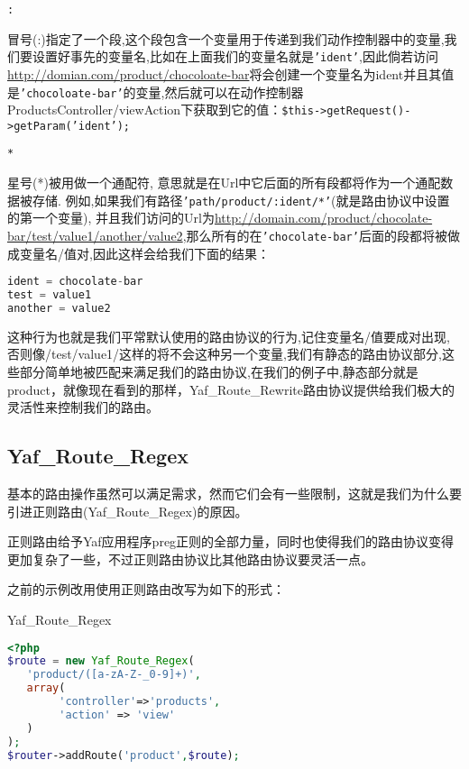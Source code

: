 \begin{compactitem}
\item \texttt{:}

冒号(:)指定了一个段,这个段包含一个变量用于传递到我们动作控制器中的变量,我们要设置好事先的变量名,比如在上面我们的变量名就是\texttt{'ident'},因此倘若访问\url{http://domian.com/product/chocoloate-bar}将会创建一个变量名为ident并且其值是\texttt{'chocoloate-bar'}的变量,然后就可以在动作控制器ProductsController/viewAction下获取到它的值：\texttt{\$this->getRequest()->getParam('ident');}


\item \texttt{*}

星号(*)被用做一个通配符, 意思就是在Url中它后面的所有段都将作为一个通配数据被存储. 例如,如果我们有路径\texttt{'path/product/:ident/*'}(就是路由协议中设置的第一个变量), 并且我们访问的Url为\url{http://domain.com/product/chocolate-bar/test/value1/another/value2},那么所有的在\texttt{'chocolate-bar'}后面的段都将被做成变量名/值对,因此这样会给我们下面的结果：

\begin{lstlisting}[language=PHP]
ident = chocolate-bar
test = value1
another = value2
\end{lstlisting}
\end{compactitem}

这种行为也就是我们平常默认使用的路由协议的行为,记住变量名/值要成对出现,否则像/test/value1/这样的将不会这种另一个变量,我们有静态的路由协议部分,这些部分简单地被匹配来满足我们的路由协议,在我们的例子中,静态部分就是product，就像现在看到的那样，Yaf\_Route\_Rewrite路由协议提供给我们极大的灵活性来控制我们的路由。

\subsection{Yaf\_Route\_Regex}

基本的路由操作虽然可以满足需求，然而它们会有一些限制，这就是我们为什么要引进正则路由(Yaf\_Route\_Regex)的原因。

正则路由给予Yaf应用程序preg正则的全部力量，同时也使得我们的路由协议变得更加复杂了一些，不过正则路由协议比其他路由协议要灵活一点。

之前的示例改用使用正则路由改写为如下的形式：

\begin{example}
Yaf\_Route\_Regex
\begin{lstlisting}[language=PHP]
<?php
$route = new Yaf_Route_Regex(
   'product/([a-zA-Z-_0-9]+)',
   array(
        'controller'=>'products',
        'action' => 'view'
   )
);
$router->addRoute('product',$route);
\end{lstlisting}
\end{example}

